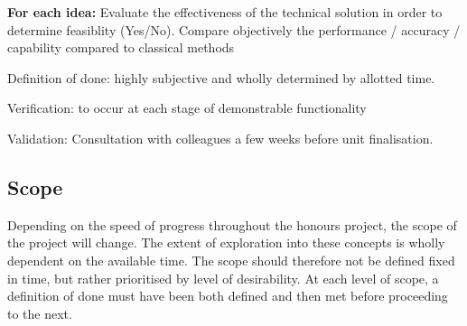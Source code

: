 
\textbf{For each idea:}
Evaluate the effectiveness of the technical solution in order to determine feasiblity (Yes/No). Compare objectively the performance / accuracy / capability compared to classical methods

Definition of done: highly subjective and wholly determined by allotted time.

Verification: to occur at each stage of demonstrable functionality

Validation: Consultation with colleagues a few weeks before unit finalisation.

\subsection{Scope}

Depending on the speed of progress throughout the honours project, the scope of the project will change. The extent of exploration into these concepts is wholly dependent on the available time. The scope should therefore not be defined fixed in time, but rather prioritised by level of desirability. At each level of scope, a definition of done must have been both defined and then met before proceeding to the next.

